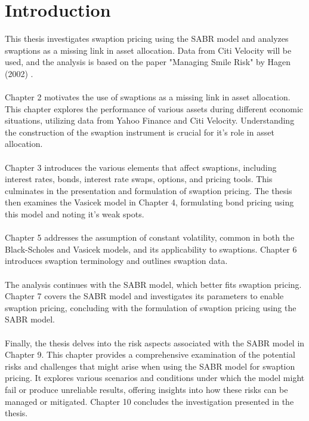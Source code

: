 \section{Introduction}

This thesis investigates swaption pricing using the SABR model
and analyzes swaptions as a missing link in asset allocation. 
Data from Citi Velocity will be used, and the analysis is 
based on the paper "Managing Smile Risk" by Hagen (2002) 
\cite{Smile}.
\\\\
Chapter 2 motivates the use of swaptions as a missing link 
in asset allocation. This chapter explores the performance 
of various assets during different economic situations, 
utilizing data from Yahoo Finance and Citi Velocity. 
Understanding the construction of the swaption instrument 
is crucial for it's role in asset allocation.
\\\\
Chapter 3 introduces the various elements that affect 
swaptions, including interest rates, bonds, interest 
rate swaps, options, and pricing tools. This culminates 
in the presentation and formulation of swaption pricing. 
The thesis then examines the Vasicek model in Chapter 4, 
formulating bond pricing using this model and noting it's 
weak spots.
\\\\
Chapter 5 addresses the assumption of constant volatility, 
common in both the Black-Scholes and Vasicek models, 
and its applicability to swaptions. Chapter 6 introduces 
swaption terminology and outlines swaption data.
\\\\
The analysis continues with the SABR model, which better 
fits swaption pricing. Chapter 7 covers the SABR model 
and investigates its parameters to enable swaption pricing, 
concluding with the formulation of swaption pricing using 
the SABR model.
\\\\
Finally, the thesis delves into the risk aspects associated 
with the SABR model in Chapter 9. This chapter provides a 
comprehensive examination of the potential risks and 
challenges that might arise when using the SABR model 
for swaption pricing. It explores various scenarios and 
conditions under which the model might fail or produce 
unreliable results, offering insights into how these 
risks can be managed or mitigated.
Chapter 10 concludes the investigation presented in the thesis. 
